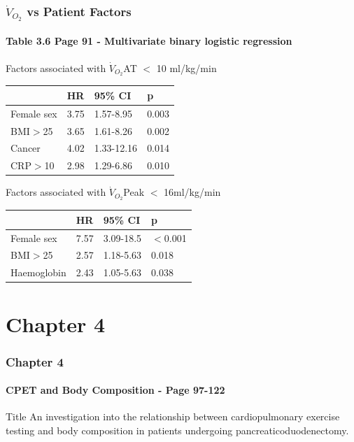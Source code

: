 \documentclass[10pt]{beamer}
\begin{document}
\begin{frame}
	\frametitle{$\dot{V}_{O_2}$ vs Patient Factors }
	\framesubtitle{Table 3.6 Page 91 - Multivariate binary logistic regression}

	Factors associated with $\dot{V}_{O_2}$AT $<$ 10 ml/kg/min
	\begin{table}
		\begin{tabular}{l l l l}
			           & HR   & 95\% CI    & p     \\ \hline
			Female sex & 3.75 & 1.57-8.95  & 0.003 \\
			BMI$>$25   & 3.65 & 1.61-8.26  & 0.002 \\
			Cancer     & 4.02 & 1.33-12.16 & 0.014 \\
			CRP$>$10   & 2.98 & 1.29-6.86  & 0.010
		\end{tabular}
	\end{table}
	
	Factors associated with $\dot{V}_{O_2}$Peak $<$ 16ml/kg/min
	\begin{table}
		\begin{tabular}{l l l l}
			            & HR   & 95\% CI   & p        \\ \hline
			Female sex  & 7.57 & 3.09-18.5 & $<$0.001 \\
			BMI$>$25    & 2.57 & 1.18-5.63 & 0.018    \\
			Haemoglobin & 2.43 & 1.05-5.63 & 0.038
		\end{tabular}
	\end{table}
\end{frame}


\section{Chapter 4}

\begin{frame}
	\frametitle{Chapter 4}
	\framesubtitle{CPET and Body Composition - Page 97-122 }
	\begin{block}{Title}
		An investigation into the relationship between cardiopulmonary exercise testing and body composition in patients undergoing pancreaticoduodenectomy.
	\end{block}
\end{frame}
\end{document}
